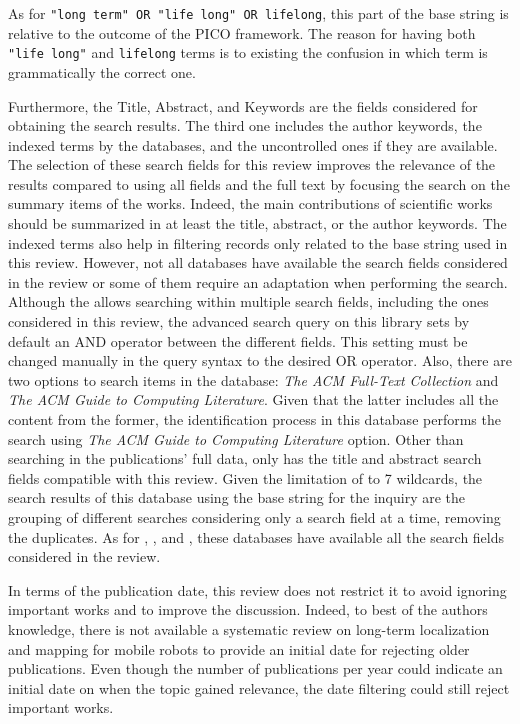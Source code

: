 \documentclass[10pt,a4paper,notitlepage,twocolumn,oneside]{article}
\begin{document}
As for \texttt{"long term" OR "life long" OR lifelong}, this part of the base string is relative to the outcome of the PICO framework. The reason for having both \texttt{"life long"} and \texttt{lifelong} terms is to existing the confusion in which term is grammatically the correct one.

Furthermore, the Title, Abstract, and Keywords are the fields considered for obtaining the search results. The third one includes the author keywords, the indexed terms by the databases, and the uncontrolled ones if they are available. The selection of these search fields for this review improves the relevance of the results compared to using all fields and the full text by focusing the search on the summary items of the works. Indeed, the main contributions of scientific works should be summarized in at least the title, abstract, or the author keywords. The indexed terms also help in filtering records only related to the base string used in this review.
However, not all databases have available the search fields considered in the review or some of them require an adaptation when performing the search. 
Although the  allows searching within multiple search fields, including the ones considered in this review, the advanced search query on this library sets by default an AND operator between the different fields. This setting must be changed manually in the query syntax to the desired OR operator. Also, there are two options to search items in the  database: \textit{The ACM Full-Text Collection} and \textit{The ACM Guide to Computing Literature}. Given that the latter includes all the content from the former, the identification process in this database performs the search using \textit{The ACM Guide to Computing Literature} option.
Other than searching in the publications' full data,  only has the title and abstract search fields compatible with this review. Given the limitation of  to 7 wildcards, the search results of this database using the base string for the inquiry are the grouping of different searches considering only a search field at a time, removing the duplicates. As for , , and , these databases have available all the search fields considered in the review.

In terms of the publication date, this review does not restrict it to avoid ignoring important works and to improve the discussion. Indeed, to best of the authors knowledge, there is not available a systematic review on long-term localization and mapping for mobile robots to provide an initial date for rejecting older publications. Even though the number of publications per year could indicate an initial date on when the topic gained relevance, the date filtering could still reject important works.
\end{document}
